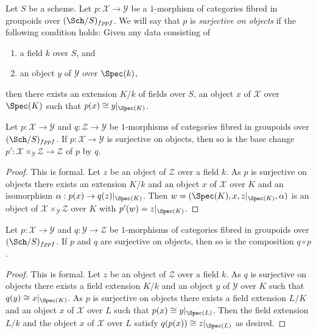 \noindent
Let $S$ be a scheme. Let $p : \mathcal{X} \to \mathcal{Y}$ be a $1$-morphism
of categories fibred in groupoids over $(\Sch/S)_{fppf}$. We will say that
$p$ is {\it surjective on objects} if the following condition holds:
Given any data consisting of
\begin{enumerate}
\item a field $k$ over $S$, and
\item an object $y$ of $\mathcal{Y}$ over $\Spec(k)$,
\end{enumerate}
then there exists an extension $K/k$ of fields over $S$, an
object $x$ of $\mathcal{X}$ over $\Spec(K)$
such that $p(x) \cong y|_{\Spec(K)}$.

\begin{lemma}
\label{lemma-base-change-surjective}
Let $p : \mathcal{X} \to \mathcal{Y}$ and $q : \mathcal{Z} \to \mathcal{Y}$
be $1$-morphisms of categories fibred in groupoids over $(\Sch/S)_{fppf}$.
If $p : \mathcal{X} \to \mathcal{Y}$ is surjective on objects, then so
is the base change
$p' : \mathcal{X} \times_\mathcal{Y} \mathcal{Z} \to \mathcal{Z}$
of $p$ by $q$.
\end{lemma}

\begin{proof}
This is formal. Let $z$ be an object of $\mathcal{Z}$ over a field $k$.
As $p$ is surjective on objects there exists an extension $K/k$
and an object $x$ of $\mathcal{X}$ over $K$ and an isomorphism
$\alpha : p(x) \to q(z)|_{\Spec(K)}$. Then
$w = (\Spec(K), x, z|_{\Spec(K)}, \alpha)$ is an object of
$\mathcal{X} \times_\mathcal{Y} \mathcal{Z}$ over $K$ with
$p'(w) = z|_{\Spec(K)}$.
\end{proof}

\begin{lemma}
\label{lemma-composition-surjective}
Let $p : \mathcal{X} \to \mathcal{Y}$ and $q : \mathcal{Y} \to \mathcal{Z}$
be $1$-morphisms of categories fibred in groupoids over $(\Sch/S)_{fppf}$.
If $p$ and $q$ are surjective on objects, then so is the composition
$q \circ p$.
\end{lemma}

\begin{proof}
This is formal. Let $z$ be an object of $\mathcal{Z}$ over a field $k$.
As $q$ is surjective on objects there exists a field extension $K/k$
and an object $y$ of $\mathcal{Y}$ over $K$ such that
$q(y) \cong x|_{\Spec(K)}$. As $p$ is surjective on objects there
exists a field extension $L/K$ and an object $x$ of $\mathcal{X}$
over $L$ such that $p(x) \cong y|_{\Spec(L)}$. Then the field extension
$L/k$ and the object $x$ of $\mathcal{X}$ over $L$ satisfy
$q(p(x)) \cong z|_{\Spec(L)}$ as desired.
\end{proof}

